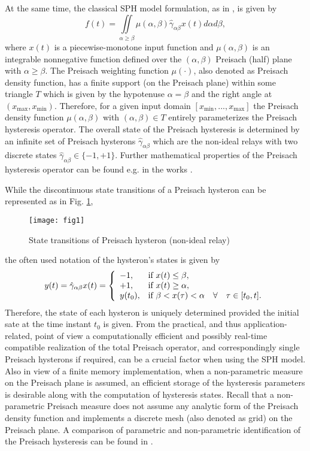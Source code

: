 \documentclass[journal]{IEEEtran}
\begin{document}
At the same time, the classical SPH model formulation, as in
\cite{Maye86}, is given by
\begin{equation}\label{1}
    f(t) = \iint \limits_{\alpha \geq \beta} \mu (\alpha, \beta)
    \hat{\gamma} _{\alpha \beta} x (t) d\alpha d\beta ,
\end{equation}
where $x(t)$ is a piecewise-monotone input function and $\mu
(\alpha, \beta)$ is an integrable nonnegative function defined
over the $(\alpha, \beta)$ Preisach (half) plane with $\alpha \geq
\beta$. The Preisach weighting function $\mu(\cdot)$, also denoted
as Preisach density function, has a finite support (on the
Preisach plane) within some triangle $T$ which is given by the
hypotenuse $\alpha = \beta$ and the right angle at $(x_{\max},
x_{\min})$. Therefore, for a given input domain $[x_{\min}, ...,
x_{\max}]$ the Preisach density function $\mu (\alpha, \beta)$
with $(\alpha, \beta) \in T$ entirely parameterizes the Preisach
hysteresis operator. The overall state of the Preisach hysteresis
is determined by an infinite set of Preisach hysterons
$\hat{\gamma}_{\alpha\beta}$ which are the non-ideal relays with
two discrete states $\hat{\gamma}_{\alpha\beta} \in \{-1, +1\}$.
Further mathematical properties of the Preisach hysteresis
operator can be found e.g. in the works \cite{Maye86,brokate1989}.

While the discontinuous state transitions of a Preisach hysteron
can be represented as in Fig. \ref{fig:1},
\begin{figure}[!h]
\centering
\texttt{[image: fig1]}
\caption{State transitions of Preisach hysteron (non-ideal relay)}
\label{fig:1}
\end{figure}
the often used notation of the hysteron's states is given by
\begin{equation}\label{2}
y(t) = \hat{\gamma} _{\alpha\beta} x(t) =
\left\{\begin{array}{ll}
    -1, & \hbox{if } x(t) \leq \beta, \\
    +1, & \hbox{if } x(t) \geq \alpha, \\
    y(t_{0}), & \hbox{if } \beta < x(\tau) < \alpha \quad \forall \quad \tau \in[t_{0},
    t].\\
\end{array}\right.
\end{equation}
Therefore, the state of each hysteron is uniquely determined
provided the initial sate at the time instant $t_{0}$ is given.
From the practical, and thus application-related, point of view a
computationally efficient and possibly real-time compatible
realization of the total Preisach operator, and correspondingly
single Preisach hysterons if required, can be a crucial factor
when using the SPH model. Also in view of a finite memory
implementation, when a non-parametric measure on the Preisach
plane is assumed, an efficient storage of the hysteresis
parameters is desirable along with the computation of hysteresis
states. Recall that a non-parametric Preisach measure does not
assume any analytic form of the Preisach density function and
implements a discrete mesh (also denoted as grid) on the Preisach
plane. A comparison of parametric and non-parametric
identification of the Preisach hysteresis can be found in
\cite{HenzRuck02}.
\end{document}
